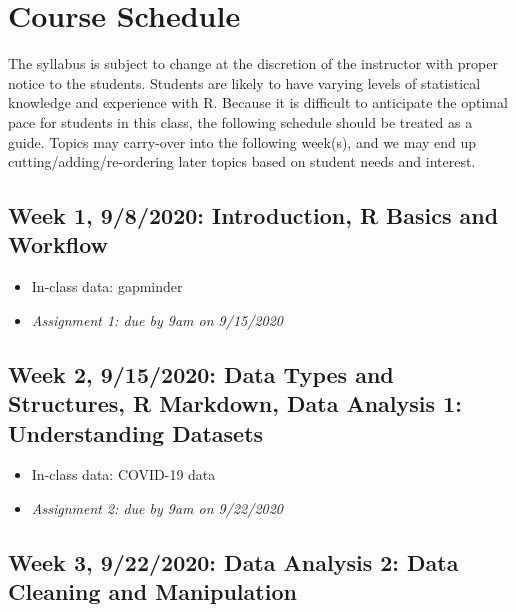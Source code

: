 \documentclass[11pt,]{article}
\providecommand{\tightlist}{%
  \setlength{\itemsep}{0pt}\setlength{\parskip}{0pt}}
\begin{document}
\hypertarget{course-schedule}{%
\section{Course Schedule}\label{course-schedule}}

The syllabus is subject to change at the discretion of the instructor
with proper notice to the students. Students are likely to have varying
levels of statistical knowledge and experience with R. Because it is
difficult to anticipate the optimal pace for students in this class, the
following schedule should be treated as a guide. Topics may carry-over
into the following week(s), and we may end up cutting/adding/re-ordering
later topics based on student needs and interest.

\hypertarget{week-1-982020-introduction-r-basics-and-workflow}{%
\subsection{Week 1, 9/8/2020: Introduction, R Basics and
Workflow}\label{week-1-982020-introduction-r-basics-and-workflow}}

\begin{itemize}
\tightlist
\item
  In-class data: gapminder
\item
  \emph{Assignment 1: due by 9am on 9/15/2020} \medskip
\end{itemize}

\hypertarget{week-2-9152020-data-types-and-structures-r-markdown-data-analysis-1-understanding-datasets}{%
\subsection{Week 2, 9/15/2020: Data Types and Structures, R Markdown,
Data Analysis 1: Understanding
Datasets}\label{week-2-9152020-data-types-and-structures-r-markdown-data-analysis-1-understanding-datasets}}

\begin{itemize}
\tightlist
\item
  In-class data: COVID-19 data
\item
  \emph{Assignment 2: due by 9am on 9/22/2020} \medskip
\end{itemize}

\hypertarget{week-3-9222020-data-analysis-2-data-cleaning-and-manipulation}{%
\subsection{Week 3, 9/22/2020: Data Analysis 2: Data Cleaning and
Manipulation}\label{week-3-9222020-data-analysis-2-data-cleaning-and-manipulation}}
\end{document}

